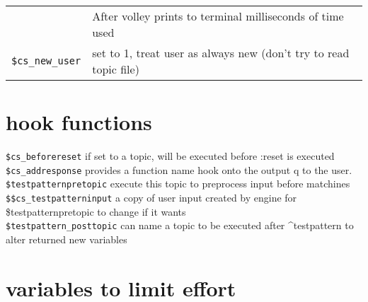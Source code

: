 \documentclass[]{article}
\begin{document}
\begin{longtable}[]{@{}ll@{}}
\begin{minipage}[t]{0.26\columnwidth}
\end{minipage} & \begin{minipage}[t]{0.10\columnwidth}\raggedright\strut
After volley prints to terminal milliseconds of time used\strut
\end{minipage}\tabularnewline
\begin{minipage}[t]{0.26\columnwidth}\raggedright\strut
\texttt{\$cs\_new\_user}\strut
\end{minipage} & \begin{minipage}[t]{0.10\columnwidth}\raggedright\strut
set to 1, treat user as always new (don't try to read topic file)\strut
\end{minipage}\tabularnewline
\bottomrule
\end{longtable}

\section{hook functions}\label{hook-functions}

\texttt{\$cs\_beforereset} \textbar{} if set to a topic, will be
executed before :reset is executed \textbar{}\\
\texttt{\$cs\_addresponse} \textbar{} provides a function name hook onto
the output q to the user. \textbar{}\\
\texttt{\$testpatternpretopic} \textbar{} execute this topic to
preprocess input before matchines \textbar{}\\
\texttt{\$\$cs\_testpatterninput} \textbar{} a copy of user input
created by engine for \$testpatternpretopic to change if it wants
\textbar{}\\
\texttt{\$testpattern\_posttopic} \textbar{} can name a topic to be
executed after \^{}testpattern to alter returned new variables
\textbar{}

\section{variables to limit effort}\label{variables-to-limit-effort}
\end{document}
